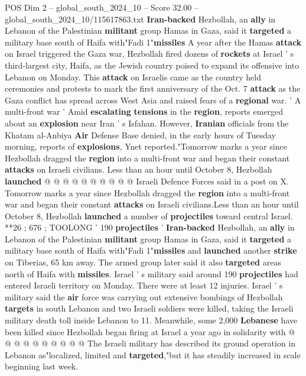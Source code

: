 \begin{textsample}{POS Dim 2 – global\_south\_2024\_10 – Score 32.00 – global\_south\_2024\_10/115617863.txt}  \label{ex:f2_pos_028}
\textbf{Iran-backed} Hezbollah, an \textbf{ally} in Lebanon of the Palestinian \textbf{militant} group Hamas in Gaza, said it \textbf{targeted} a military base south of Haifa with"Fadi 1"\textbf{missiles} A year after the Hamas \textbf{attack} on Israel triggered the Gaza war, Hezbollah fired dozens of \textbf{rockets} at Israel ' s third-largest city, Haifa, as the Jewish country poised to expand its offensive into Lebanon on Monday.
This \textbf{attack} on Israelis came as the country held ceremonies and protests to mark the first anniversary of the Oct. 7 \textbf{attack} as the Gaza conflict has spread across West Asia and raised fears of a \textbf{regional} war. ' A multi-front war ' Amid \textbf{escalating} \textbf{tensions} in the \textbf{region}, reports emerged about an \textbf{explosion} near Iran ' s Isfahan.
However, \textbf{Iranian} officials from the Khatam al-Anbiya \textbf{Air} Defense Base denied, in the early hours of Tuesday morning, reports of \textbf{explosions}, Ynet reported."Tomorrow marks a year since Hezbollah dragged the \textbf{region} into a multi-front war and began their constant \textbf{attacks} on Israeli civilians.
Less than an hour until October 8, Hezbollah \textbf{launched} @ @ @ @ @ @ @ @ @ @ Israeli Defence Forces said in a post on X.
Tomorrow marks a year since Hezbollah dragged the \textbf{region} into a multi-front war and began their constant \textbf{attacks} on Israeli civilians.Less than an hour until October 8, Hezbollah \textbf{launched} a number of \textbf{projectiles} toward central Israel. **26 ; 676 ; TOOLONG ' 190 \textbf{projectiles} ' \textbf{Iran-backed} Hezbollah, an \textbf{ally} in Lebanon of the Palestinian \textbf{militant} group Hamas in Gaza, said it \textbf{targeted} a military base south of Haifa with"Fadi 1"\textbf{missiles} and \textbf{launched} another \textbf{strike} on Tiberias, 65 km away.
The armed group later said it also \textbf{targeted} areas north of Haifa with \textbf{missiles}.
Israel ' s military said around 190 \textbf{projectiles} had entered Israeli territory on Monday.
There were at least 12 injuries.
Israel ' s military said the \textbf{air} force was carrying out extensive bombings of Hezbollah \textbf{targets} in south Lebanon and two Israeli soldiers were killed, taking the Israeli military death toll inside Lebanon to 11.
Meanwhile, some 2,000 \textbf{Lebanese} have been killed since Hezbollah began firing at Israel a year ago in solidarity with @ @ @ @ @ @ @ @ @ @ The Israeli military has described its ground operation in Lebanon as"localized, limited and \textbf{targeted},"but it has steadily increased in scale beginning last week.

\end{textsample}
